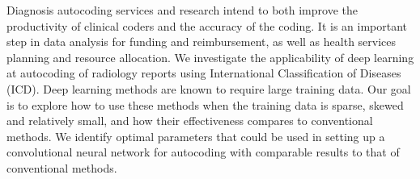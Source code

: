 Diagnosis autocoding services and research intend to both improve the productivity of clinical coders and the accuracy of the coding. It is an important step in data analysis for funding and reimbursement, as well as health services planning and resource allocation. We investigate the applicability of deep learning at autocoding of radiology reports using International Classification of Diseases (ICD). Deep learning methods are known to require large training data. Our goal is to explore how to use these methods when the training data is sparse, skewed and relatively small, and how their effectiveness compares to conventional methods. We identify optimal parameters that could be used in setting up a convolutional neural network for autocoding with comparable results to that of conventional methods.
